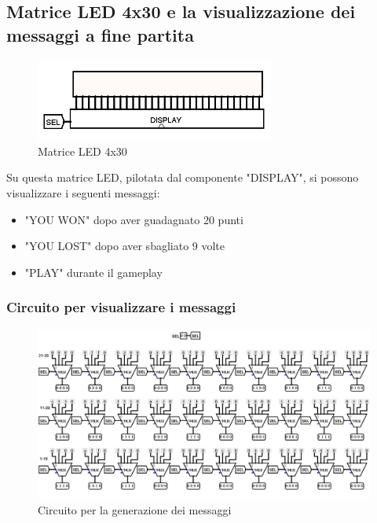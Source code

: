 \documentclass[11pt]{article}
\begin{document}
\subsection{Matrice LED 4x30 e la visualizzazione dei messaggi a fine partita}

\begin{figure}[!htpb]
\centering
\includegraphics[width=0.7\textwidth, center]{immagini/matrice_led4x30}
\caption{Matrice LED 4x30}
\label{fig:fig5}
\end{figure}

Su questa matrice LED, pilotata dal componente "DISPLAY", si possono visualizzare  i seguenti messaggi:
\begin{itemize}
\item "YOU WON" dopo aver guadagnato 20 punti
\item "YOU LOST" dopo aver sbagliato 9 volte
\item "PLAY" durante il gameplay
\end{itemize}

\subsubsection{Circuito per visualizzare i messaggi}

\begin{figure}[!htpb]
\centering
\includegraphics[width=1.15\textwidth, center]{immagini/circuito_matriceLED4x30}
\caption{Circuito per la generazione dei messaggi}
\label{fig:fig6}
\end{figure}
\end{document}
